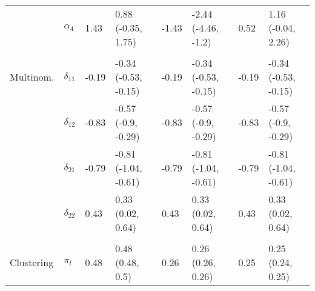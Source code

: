 \documentclass[]{article}
\begin{document}
\begin{table}[t]
\begin{tabular}{llllllll}
\hspace{1em} & $\alpha_{4}$ & 1.43 & 0.88 (-0.35, 1.75) & -1.43 & -2.44 (-4.46, -1.2) & 0.52 & 1.16 (-0.04, 2.26)\\
\addlinespace[0.3em]
\multicolumn{8}{l}{\textbf{ }}\\
\hspace{1em}Multinom. & $\delta_{11}$ & -0.19 & -0.34 (-0.53, -0.15) & -0.19 & -0.34 (-0.53, -0.15) & -0.19 & -0.34 (-0.53, -0.15)\\
\hspace{1em} & $\delta_{12}$ & -0.83 & -0.57 (-0.9, -0.29) & -0.83 & -0.57 (-0.9, -0.29) & -0.83 & -0.57 (-0.9, -0.29)\\
\hspace{1em} & $\delta_{21}$ & -0.79 & -0.81 (-1.04, -0.61) & -0.79 & -0.81 (-1.04, -0.61) & -0.79 & -0.81 (-1.04, -0.61)\\
\hspace{1em} & $\delta_{22}$ & 0.43 & 0.33 (0.02, 0.64) & 0.43 & 0.33 (0.02, 0.64) & 0.43 & 0.33 (0.02, 0.64)\\
\addlinespace[0.3em]
\multicolumn{8}{l}{\textbf{ }}\\
\hspace{1em}Clustering & $\pi_l$ & 0.48 & 0.48 (0.48, 0.5) & 0.26 & 0.26 (0.26, 0.26) & 0.25 & 0.25 (0.24, 0.25)\\
\bottomrule
\end{tabular}
\end{table}
\end{document}
